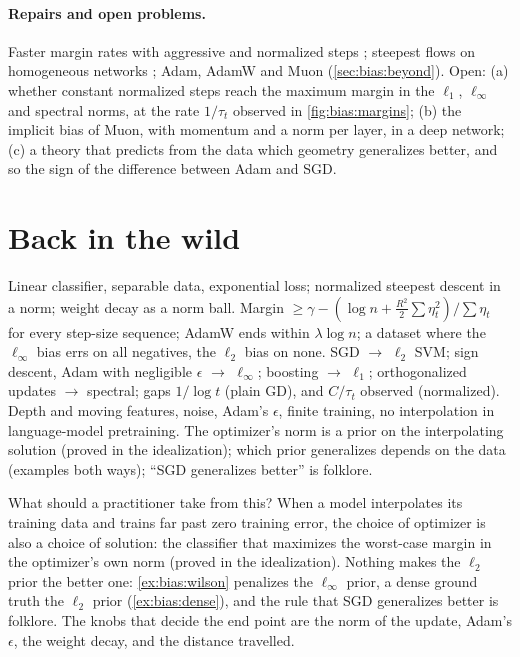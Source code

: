 \begin{refsection}
\paragraph{Repairs and open problems.} Faster margin rates with aggressive and normalized steps \parencite{NacsonEtAl2019,JiTelgarsky2021}; steepest flows on homogeneous networks \parencite{TsilivisVardiKempe2025}; Adam, AdamW and Muon (\cref{sec:bias:beyond}). Open: (a) whether constant normalized steps reach the maximum margin in the $\ell_1$, $\ell_\infty$ and spectral norms, at the rate $1/\tau_t$ observed in \cref{fig:bias:margins}; (b) the implicit bias of Muon, with momentum and a norm per layer, in a deep network; (c) a theory that predicts from the data which geometry generalizes better, and so the sign of the difference between Adam and SGD.

\section{Back in the wild}\label{sec:bias:back}

{Linear classifier, separable data, exponential loss; normalized steepest descent in a norm; weight decay as a norm ball.}
{Margin $\ge\gamma-(\log n+\frac{R^2}2\sum\eta_t^2)/\sum\eta_t$ for every step-size sequence; AdamW ends within $\lambda\log n$; a dataset where the $\ell_\infty$ bias errs on all negatives, the $\ell_2$ bias on none.}
{SGD $\to$ $\ell_2$ SVM; sign descent, Adam with negligible $\epsilon$ $\to$ $\ell_\infty$; boosting $\to$ $\ell_1$; orthogonalized updates $\to$ spectral; gaps $1/\log t$ (plain GD), and $C/\tau_t$ observed (normalized).}
{Depth and moving features, noise, Adam's $\epsilon$, finite training, no interpolation in language-model pretraining.}
{The optimizer's norm is a prior on the interpolating solution (proved in the idealization); which prior generalizes depends on the data (examples both ways); ``SGD generalizes better'' is folklore.}

What should a practitioner take from this? When a model interpolates its training data and trains far past zero training error, the choice of optimizer is also a choice of solution: the classifier that maximizes the worst-case margin in the optimizer's own norm (proved in the idealization). Nothing makes the $\ell_2$ prior the better one: \cref{ex:bias:wilson} penalizes the $\ell_\infty$ prior, a dense ground truth the $\ell_2$ prior (\cref{ex:bias:dense}), and the rule that SGD generalizes better is folklore. The knobs that decide the end point are the norm of the update, Adam's $\epsilon$, the weight decay, and the distance travelled.


\end{refsection}
